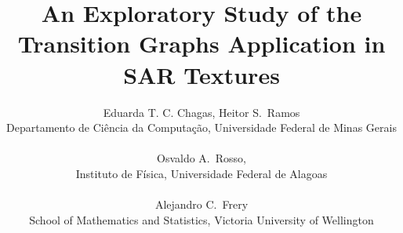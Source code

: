 \documentclass[a4paper]{article}
\date{}
\begin{document}
\thispagestyle{empty}

\title{\textbf{An Exploratory Study of the Transition Graphs Application in SAR Textures}}

\author{Eduarda T. C. Chagas, Heitor S.\ Ramos \\ 
	Departamento de Ci\^encia da Computa\c c\~ao, Universidade Federal de Minas Gerais \\ \\ 
	
	Osvaldo A.\ Rosso, \\
	Instituto de F\'isica, Universidade Federal de Alagoas\\ \\
	
	Alejandro C.\ Frery \\
	School of Mathematics and Statistics, Victoria University of Wellington
}

\date{}
\maketitle\thispagestyle{empty} 
\end{document}
